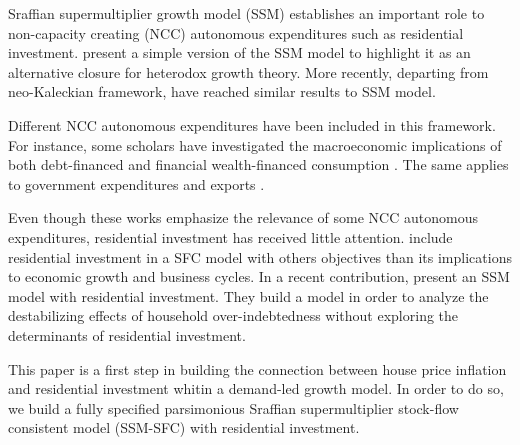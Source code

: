 \documentclass[12pt]{article}
\begin{document}
Sraffian supermultiplier growth model (SSM) establishes an important role to non-capacity creating (NCC) autonomous expenditures such
as residential investment.
\textcite{serrano_long_1995,serrano_sraffian_2017} present a simple version of the SSM model to highlight it as an alternative closure for heterodox growth theory.
More recently, departing from neo-Kaleckian framework, \textcites{allain_tackling_2015}{lavoie_post-keynesian_2015}{lavoie_convergence_2016} have reached similar results to SSM model. 

Different NCC autonomous expenditures have been included in this framework. 
For instance, some scholars have investigated the macroeconomic implications of both debt-financed \cites{pariboni_autonomous_2015}{fagundes_role_2017}{mandarino-2020-worker-debt} and financial wealth-financed consumption \cite{brochier_supermultiplier_2018}.
The same applies to government expenditures \cites{allain_tackling_2015}{bougrine_autonomous_2020} and exports \cite{nah_long-run_2017}.

Even though these works emphasize the relevance of some NCC autonomous expenditures, residential investment has received little attention.
\textcites{zezza_u.s._2008}{nikolaidi_securitisation_2015} include residential investment in a SFC model with others objectives than its implications to economic growth and business cycles.
In a recent contribution, \textcite{dejuan_supermultiplier-cum-finance_2018} present an SSM model with residential investment.
They build a model in order to analyze the destabilizing effects of household over-indebtedness without exploring the determinants of residential investment.

This paper is a first step in building the connection between house price inflation and residential investment whitin a demand-led growth model.
In order to do so, we build a fully specified parsimonious Sraffian supermultiplier stock-flow consistent model (SSM-SFC) with residential investment.
\end{document}
